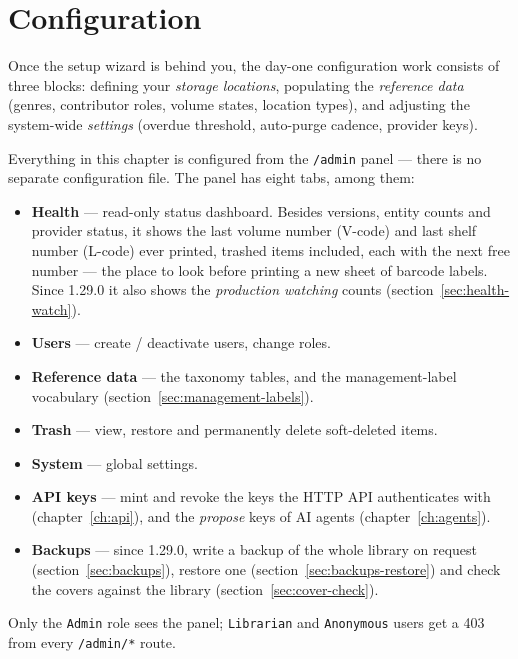 \chapter{Configuration}
\label{ch:configuration}

Once the setup wizard is behind you, the day-one configuration work
consists of three blocks: defining your \emph{storage
locations}, populating the \emph{reference
data} (genres, contributor roles, volume states, location types),
and adjusting the system-wide \emph{settings} (overdue threshold,
auto-purge cadence, provider keys).

Everything in this chapter is configured from the
\texttt{/admin} panel — there is no separate
configuration file. The panel has eight tabs, among them:

\begin{itemize}
  \item \textbf{Health} — read-only status dashboard. Besides versions,
        entity counts and provider status, it shows the last volume
        number (V-code) and last shelf number (L-code) ever printed,
        trashed items included, each with the next free number — the
        place to look before printing a new sheet of barcode labels.
        Since 1.29.0 it also shows the \emph{production watching}
        counts (section~\ref{sec:health-watch}).
  \item \textbf{Users} — create / deactivate users, change roles.
  \item \textbf{Reference data} — the taxonomy tables, and the
        management-label vocabulary (section~\ref{sec:management-labels}).
  \item \textbf{Trash} — view, restore and permanently delete
        soft-deleted items.
  \item \textbf{System} — global settings.
  \item \textbf{API keys} — mint and revoke the keys the HTTP API
        authenticates with (chapter~\ref{ch:api}), and the
        \emph{propose} keys of AI agents (chapter~\ref{ch:agents}).
  \item \textbf{Backups} — since 1.29.0, write a backup of the whole
        library on request (section~\ref{sec:backups}), restore one
        (section~\ref{sec:backups-restore}) and check the covers
        against the library (section~\ref{sec:cover-check}).
\end{itemize}

Only the \texttt{Admin} role sees the panel; \texttt{Librarian} and
\texttt{Anonymous} users get a 403 from every \texttt{/admin/*}
route.

